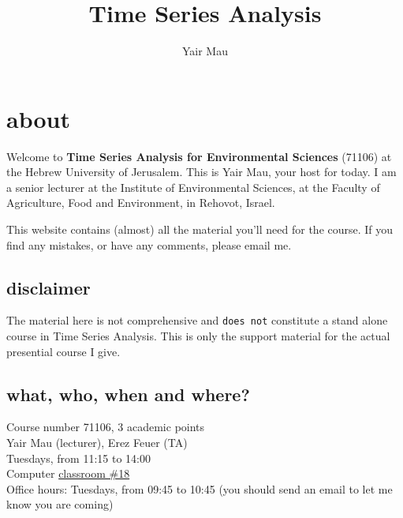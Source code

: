 \documentclass[
  letterpaper,
  DIV=11,
  numbers=noendperiod]{scrreprt}
\title{Time Series Analysis}
\author{Yair Mau}
\date{}
\renewcommand*\contentsname{Table of contents}
\newcommand\contentsname{Table of contents}
\begin{document}
\maketitle

\renewcommand*\contentsname{Table of contents}
{
\hypersetup{linkcolor=}
\setcounter{tocdepth}{2}
\tableofcontents
}


\chapter*{about}\label{about}


Welcome to \textbf{Time Series Analysis for Environmental Sciences}
(71106) at the Hebrew University of Jerusalem. This is Yair Mau, your
host for today. I am a senior lecturer at the Institute of Environmental
Sciences, at the Faculty of Agriculture, Food and Environment, in
Rehovot, Israel.

This website contains (almost) all the material you'll need for the
course. If you find any mistakes, or have any comments, please email me.

\section*{disclaimer}\label{disclaimer}


The material here is not comprehensive and \texttt{does\ not} constitute
a stand alone course in Time Series Analysis. This is only the support
material for the actual presential course I give.

\section*{what, who, when and where?}\label{what-who-when-and-where}


Course number 71106, 3 academic points\\
Yair Mau (lecturer), Erez Feuer (TA)\\
Tuesdays, from 11:15 to 14:00\\
Computer \href{https://goo.gl/maps/rzniv9NuyEs4ETH58}{classroom \#18}\\
Office hours: Tuesdays, from 09:45 to 10:45 (you should send an email to
let me know you are coming)
\end{document}
